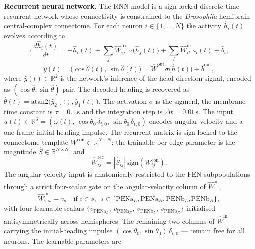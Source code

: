 \documentclass[11pt]{article}
\begin{document}
\textbf{Recurrent neural network.}\label{method:RNN}
The RNN model is a sign-locked discrete-time recurrent network whose connectivity is constrained to the \emph{Drosophila} hemibrain central-complex connectome. For each neuron $i\in\{1,\dots,N\}$ the activity $\hat{h}_i(t)$ evolves according to
\begin{equation}
\tau\,\frac{d\hat{h}_i(t)}{dt} = -\hat{h}_i(t)
  + \sum_j \hat{W}^{\mathrm{rec}}_{ij}\,\sigma\!\big(\hat{h}_j(t)\big)
  + \sum_l \hat{W}^{\mathrm{in}}_{il}\,u_l(t)
  + \hat{b}_i,
\label{eq:cx_dynamics}
\end{equation}
\begin{equation}
\hat{y}(t) = \big(\cos\hat{\theta}(t),\,\sin\hat{\theta}(t)\big) = \hat{W}^{\mathrm{out}}\sigma\big(\hat{h}(t)\big) + \hat{b}^{\mathrm{out}},
\label{eq:cx_readout}
\end{equation}
where $\hat{y}(t)\in\mathbb{R}^2$ is the network's inference of the head-direction signal, encoded as $(\cos\hat\theta,\sin\hat\theta)$ pair. The decoded heading is recovered as $\hat\theta(t) = \mathrm{atan2}\big(\hat y_2(t), \hat y_1(t)\big)$. The activation $\sigma$ is the sigmoid, the membrane time constant is $\tau = 0.1\,\mathrm{s}$ and the integration step is $\Delta t = 0.01\,\mathrm{s}$. The input $u(t)\in\mathbb{R}^3 = (\omega(t),\,\cos\theta_0\,\delta_{t,0},\,\sin\theta_0\,\delta_{t,0})$ encodes angular velocity and a one-frame initial-heading impulse. The recurrent matrix is sign-locked to the connectome template $W^{\mathrm{con}}\in\mathbb{R}^{N\times N}$: the trainable per-edge parameter is the magnitude $\hat{S}\in\mathbb{R}^{N\times N}$, and
\begin{equation}
\hat{W}^{\mathrm{rec}}_{ij} = |\hat{S}_{ij}|\,\mathrm{sign}(W^{\mathrm{con}}_{ij}).
\label{eq:cx_w_rec}
\end{equation}
The angular-velocity input is anatomically restricted to the PEN subpopulations through a strict four-scalar gate on the angular-velocity column of $\hat{W}^{\mathrm{in}}$,
\begin{equation}
\hat{W}^{\mathrm{in}}_{i,\omega} = v_s \quad \text{if } i \in s,\ \ s \in \{\mathrm{PENa}_L,\mathrm{PENa}_R,\mathrm{PENb}_L,\mathrm{PENb}_R\},
\label{eq:cx_pen_gate}
\end{equation}
with four learnable scalars $\{v_{\mathrm{PENa}_L},\,v_{\mathrm{PENa}_R},\,v_{\mathrm{PENb}_L},\,v_{\mathrm{PENb}_R}\}$ initialised antisymmetrically across hemispheres. The remaining two columns of $\hat{W}^{\mathrm{in}}$ --- carrying the initial-heading impulse $(\cos\theta_0,\sin\theta_0)\,\delta_{t,0}$ --- remain free for all neurons. The learnable parameters are
\end{document}
